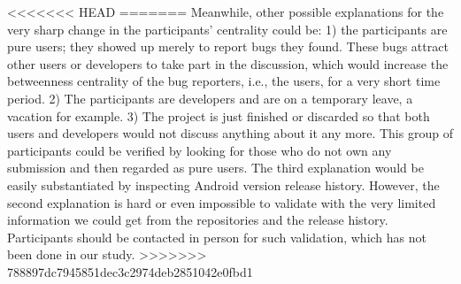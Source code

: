 \documentclass[conference]{IEEEtran}
\begin{document}
<<<<<<< HEAD
=======
Meanwhile, other possible explanations for the very sharp change in
the participants' centrality could be: 1) the participants are pure
users; they showed up merely to report bugs they found. These bugs
attract other users or developers to take part in the discussion,
which would increase the betweenness centrality of the bug reporters,
i.e., the users, for a very short time period. 2) The participants are
developers and are on a temporary leave, a vacation for
example. 
3) The project is just
finished or discarded so that both users and developers would not
discuss anything about it any more. This group of participants could be
verified by looking for those who do not own any submission and then
regarded as pure users. 
The third explanation would be easily
substantiated by inspecting Android version release history. However,
the second explanation is hard or even impossible to validate with the
very limited information we could get from the repositories and the
release history. Participants should be contacted in person for such
validation, which has not been done in our study.
>>>>>>> 788897dc7945851dec3c2974deb2851042e0fbd1
\end{document}
